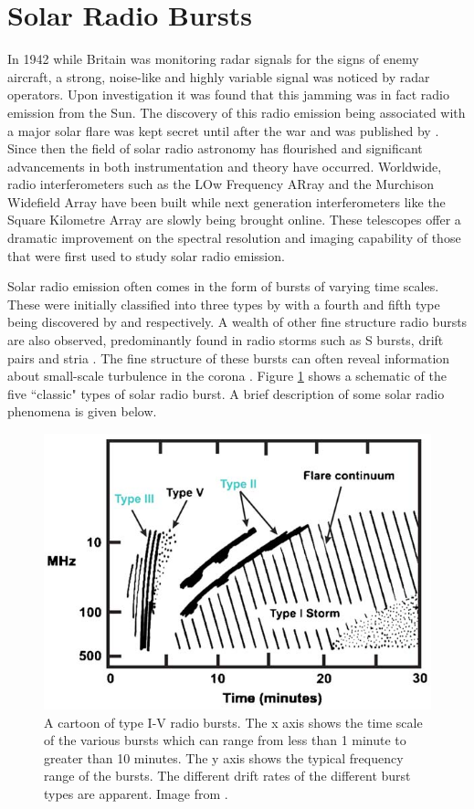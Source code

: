 \section{Solar Radio Bursts}
\label{sec:solar_radio_bursts}
In 1942 while Britain was monitoring radar signals for the signs of enemy aircraft, a strong, noise-like and highly variable signal was noticed by radar operators. Upon investigation it was found that this jamming was in fact radio emission from the Sun. The discovery of this radio emission being associated with a major solar flare was kept secret until after the war and was published by \cite{Appleton1946}.
Since then the field of solar radio astronomy has flourished and significant advancements in both instrumentation and theory have occurred. Worldwide, radio interferometers such as the LOw Frequency ARray \cite[LOFAR;][]{VanHaarlem2013} and the Murchison Widefield Array \citep[MWA;][]{Lonsdale2009} have been built while next generation interferometers like the Square Kilometre Array \citep[SKA;][]{McMullin2020} are slowly being brought online. These telescopes offer a dramatic improvement on the spectral resolution and imaging capability of those that were first used to study solar radio emission.

Solar radio emission often comes in the form of bursts of varying time scales. These were initially classified into three types by \cite{Wild1950b} with a fourth and fifth type being discovered by \cite{Boischot1957} and \cite{Wild1959} respectively. A wealth of other fine structure radio bursts are also observed, predominantly found in radio storms such as S bursts, drift pairs and stria \citep{McConnell1980,Melrose1982,NelsonandMelrose1985}. 
The fine structure of these bursts can often reveal information about small-scale turbulence in the corona \citep{Reid2021}.
Figure \ref{fig:burst_cartoon} shows a schematic of the five ``classic" types of solar radio burst. A brief description of some solar radio phenomena is given below.
\begin{figure}
    \centering
    \includegraphics[width=0.75\columnwidth]{Images/Burst_cartoon.jpg}
    \caption[Cartoon of type I-V radio bursts.]{A cartoon of type I-V radio bursts. The x axis shows the time scale of the various bursts which can range from less than 1 minute to greater than 10 minutes. The y axis shows the typical frequency range of the bursts. The different drift rates of the different burst types are apparent. Image from \cite{Cliver2009}.}
    \label{fig:burst_cartoon}
\end{figure}
